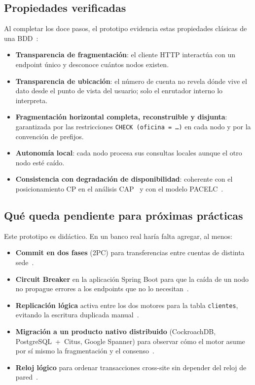\documentclass[11pt,a4paper]{article}
\begin{document}
\subsection{Propiedades verificadas}

Al completar los doce pasos, el prototipo evidencia estas propiedades cl\'asicas de una BDD~\cite{Ozsu2020Principles,Kleppmann2017DDIA}:

\begin{itemize}[leftmargin=1.2em]
    \item \textbf{Transparencia de fragmentaci\'on}: el cliente HTTP interact\'ua con un endpoint \'unico y desconoce cu\'antos nodos existen.
    \item \textbf{Transparencia de ubicaci\'on}: el n\'umero de cuenta no revela d\'onde vive el dato desde el punto de vista del usuario; solo el enrutador interno lo interpreta.
    \item \textbf{Fragmentaci\'on horizontal completa, reconstruible y disjunta}: garantizada por las restricciones \texttt{CHECK (oficina = \ldots)} en cada nodo y por la convenci\'on de prefijos.
    \item \textbf{Autonom\'ia local}: cada nodo procesa sus consultas locales aunque el otro nodo est\'e ca\'ido.
    \item \textbf{Consistencia con degradaci\'on de disponibilidad}: coherente con el posicionamiento CP en el an\'alisis CAP~\cite{Brewer2012CAPtwelve} y con el modelo PACELC~\cite{Abadi2012PACELC}.
\end{itemize}

\subsection{Qu\'e queda pendiente para pr\'oximas pr\'acticas}

Este prototipo es did\'actico. En un banco real har\'ia falta agregar, al menos:

\begin{itemize}[leftmargin=1.2em]
    \item \textbf{Commit en dos fases} (2PC) para transferencias entre cuentas de distinta sede~\cite{Gray1993Transaction}.
    \item \textbf{Circuit Breaker} en la aplicaci\'on Spring Boot para que la ca\'ida de un nodo no propague errores a los endpoints que no lo necesitan~\cite{Newman2021Microservices}.
    \item \textbf{Replicaci\'on l\'ogica} activa entre los dos motores para la tabla \texttt{clientes}, evitando la escritura duplicada manual~\cite{PostgreSQL16Docs}.
    \item \textbf{Migraci\'on a un producto nativo distribuido} (CockroachDB, PostgreSQL~+~Citus, Google Spanner) para observar c\'omo el motor asume por s\'i mismo la fragmentaci\'on y el consenso~\cite{VanSteen2023DS,Sadalage2013NoSQL}.
    \item \textbf{Reloj l\'ogico} para ordenar transacciones cross-site sin depender del reloj de pared~\cite{Lamport1978Time}.
\end{itemize}
\end{document}
